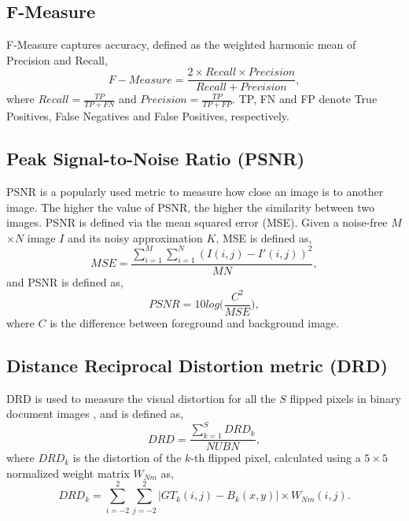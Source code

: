 \documentclass[10pt, a4paper, conference, compsocconf]{IEEEtran}
\begin{document}
\subsection{F-Measure}
F-Measure captures accuracy, defined as the weighted harmonic mean of Precision and Recall, 
\begin{equation} 
F-Measure = \frac{ 2 \times Recall \times Precision}{Recall + Precision },
\label{eq_fm}
\end{equation}
where $Recall=\frac{TP}{TP + FN}$ and $Precision=\frac{TP}{TP + FP}$. TP, FN and FP denote True Positives, False Negatives and False Positives, respectively.


\subsection{Peak Signal-to-Noise Ratio (PSNR)}
PSNR is a popularly used metric to measure how close an image is to another image. The higher the value of PSNR, the higher the similarity between two images. PSNR is defined via the mean squared error (MSE). Given a noise-free $M$$\times$$N$ image $I$ and its noisy approximation $K$, MSE is defined as,
\begin{equation} 
MSE = \frac{\sum_{i=1}^{M}\sum_{i=1}^{N}(I(i,j) - I'(i,j))^2}{MN},
\label{eq_mse}
\end{equation}
and PSNR is defined as,
\begin{equation} 
PSNR = 10 log \Big( \frac{C^2}{MSE} \Big),
\label{eq_psnr}
\end{equation}
where $C$ is the difference between foreground and background image.

\subsection{Distance Reciprocal Distortion metric (DRD)}
DRD is used to measure the visual distortion for all the $S$ flipped pixels in binary document images \cite{lu2004distance}, and is defined as,
\begin{equation} 
DRD = \frac{\sum\limits_{k=1}^{S}DRD_k}{NUBN},
\label{eq_drd}
\end{equation}
where $DRD_k$ is the distortion of the $k$-th flipped pixel, calculated using a $5 \times 5$ normalized weight matrix $W_{Nm}$ as,
\begin{equation} 
DRD_k = {\sum\limits_{i=-2}^{2} \sum\limits_{j=-2}^{2} |GT_k(i,j) - B_k(x,y)| \times W_{Nm}(i,j)}.
\label{eq_drdk}
\end{equation}
\end{document}
